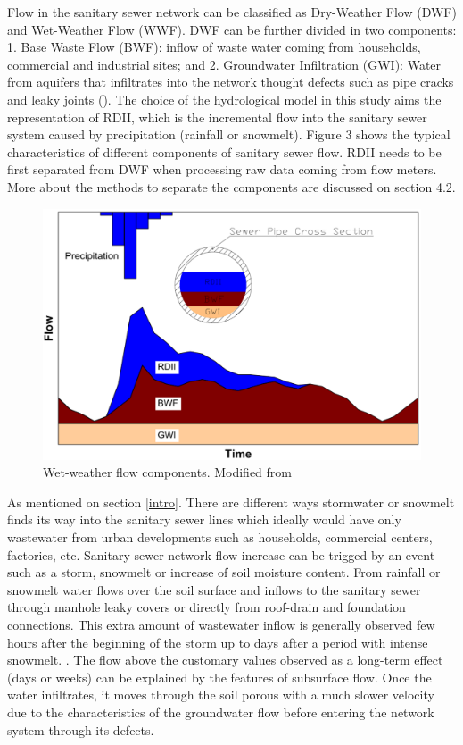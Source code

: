 



Flow in the sanitary sewer network can be classified as Dry-Weather Flow (DWF) and Wet-Weather Flow (WWF). DWF can be further divided in two components: 1. Base Waste Flow (BWF): inflow of waste water coming from households, commercial and industrial sites; and 2. Groundwater Infiltration (GWI): Water from aquifers that infiltrates into the network thought defects such as pipe cracks and leaky joints (\cite{Vallabhaneni2007}). 
The choice of the hydrological model in this study aims the representation of RDII, which is the incremental flow into the sanitary sewer system caused by precipitation (rainfall or snowmelt). Figure 3 shows the typical characteristics of different components of sanitary sewer flow. RDII needs to be first separated from DWF when processing raw data coming from flow meters. More about the methods to separate the components are discussed on section 4.2.


\begin{figure}[ht]
    \centering
	\includegraphics[scale=0.6]{figures/RDII_flows.png}
	\caption{Wet-weather flow components. Modified from \cite{Vallabhaneni2007}}
	\label{fig:flowcomponents}
\end{figure}




As mentioned on section \ref{intro}. There are different ways stormwater or snowmelt finds its way into the sanitary sewer lines which ideally would have only wastewater from urban developments such as households, commercial centers, factories, etc.  Sanitary sewer network flow increase can be trigged by an event such as a storm, snowmelt or increase of soil moisture content. From rainfall or snowmelt water flows over the soil surface and inflows to the sanitary sewer through manhole leaky covers or directly from roof-drain and foundation connections. This extra amount of wastewater inflow is generally observed few hours after the beginning of the storm up to days after a period with intense snowmelt. \cite{Rossman2016}. The flow above the customary values observed as a long-term effect (days or weeks) can be explained by the features of subsurface flow. Once the water infiltrates, it moves through the soil porous with a much slower velocity due to the characteristics of the groundwater flow before entering the network system through its defects. 


